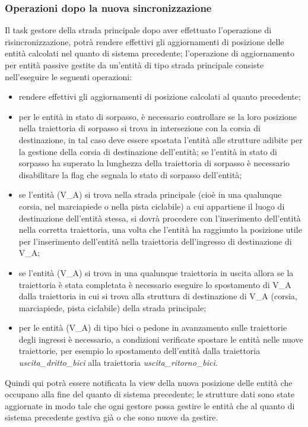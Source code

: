 \subsubsection*{Operazioni dopo la nuova sincronizzazione} 
Il task gestore della strada principale dopo aver effettuato l'operazione di risincronizzazione, potrà rendere effettivi gli aggiornamenti di posizione delle entità calcolati nel quanto di sistema precedente; l'operazione di aggiornamento per entità passive gestite da un'entità di tipo strada principale consiste nell'eseguire le seguenti operazioni:
\begin{itemize}
\item rendere effettivi gli aggiornamenti di posizione calcolati al quanto precedente;
\item per le entità in stato di sorpasso, è necessario controllare se la loro posizione nella traiettoria di sorpasso si trova in intersezione con la corsia di destinazione, in tal caso deve essere spostata l'entità alle strutture adibite per la gestione della corsia di destinazione dell'entità; se l'entità in stato di sorpasso ha superato la lunghezza della traiettoria di sorpasso è necessario disabilitare la flag che segnala lo stato di sorpasso dell'entità;
\item se l'entità (V\_A) si trova nella strada principale (cioè in una qualunque corsia, nel marciapiede o nella pista ciclabile) a cui appartiene il luogo di destinazione dell'entità stessa, si dovrà procedere con l'inserimento dell'entità nella corretta traiettoria, una volta che l'entità ha raggiunto la posizione utile per l'inserimento dell'entità nella traiettoria dell'ingresso di destinazione di V\_A;
\item se l'entità (V\_A) si trova in una qualunque traiettoria in uscita allora se la traiettoria è stata completata è necessario eseguire lo spostamento di V\_A dalla traiettoria in cui si trova alla struttura di destinazione di V\_A (corsia, marciapiede, pista ciclabile) della strada principale;
\item per le entità (V\_A) di tipo bici o pedone in avanzamento sulle traiettorie degli ingressi è necessario, a condizioni verificate spostare le entità nelle nuove traiettorie, per esempio lo spostamento dell'entità dalla traiettoria \textit{usci\-ta\_drit\-to\_bi\-ci} alla traiettoria \textit{usci\-ta\_ri\-tor\-no\_bi\-ci}.  
\end{itemize}
Quindi qui potrà essere notificata la view della nuova posizione delle entità che occupano alla fine del quanto di sistema precedente; le strutture dati sono state aggiornate in modo tale che ogni gestore possa gestire le entità che al quanto di sistema precedente gestiva già o che sono nuove da gestire.  

